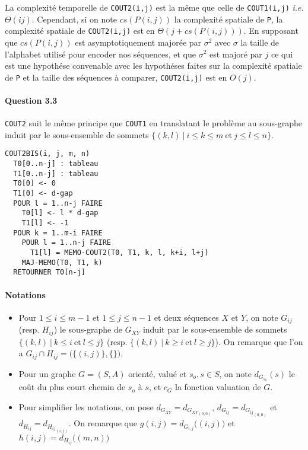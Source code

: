 La complexit\'e temporelle de \verb'COUT2(i,j)' est la m\^eme que
celle de \verb'COUT1(i,j)' \emph{i.e.} $\Theta(ij)$. Cependant, si on
note $cs(P(i,j))$ la complexit\'e spatiale de \verb'P', la
complexit\'e spatiale de \verb'COUT2(i,j)' est en
$\Theta(j+cs(P(i,j)))$. En supposant que $cs(P(i,j))$ est
asymptotiquement major\'ee par $\sigma^2$ avec $\sigma$ la taille de
l'alphabet utilis\'e pour encoder nos s\'equences, et que $\sigma^2$
est major\'e par $j$ ce qui est une hypoth\'ese convenable avec les
hypoth\'eses faites sur la complexit\'e spatiale de \verb'P' et la
taille des s\'equences \`a comparer, \verb'COUT2(i,j)' est en $O(j)$.

\paragraph{Question 3.3}
\verb'COUT2' suit le m\^eme principe que \verb'COUT1' en translatant
le probl\`eme au sous-graphe induit par le sous-ensemble de sommets
$\big\{(k,l)\ \big|\ i\leq k\leq m\ \text{et}\ j\leq l\leq n\big\}$.
\begin{verbatim}
COUT2BIS(i, j, m, n)
  T0[0..n-j] : tableau
  T1[0..n-j] : tableau
  T0[0] <- 0
  T1[0] <- d-gap
  POUR l = 1..n-j FAIRE
    T0[l] <- l * d-gap
    T1[l] <- -1
  POUR k = 1..m-i FAIRE
    POUR l = 1..n-j FAIRE
      T1[l] = MEMO-COUT2(T0, T1, k, l, k+i, l+j)
    MAJ-MEMO(T0, T1, k)
  RETOURNER T0[n-j]
\end{verbatim}
\paragraph{Notations}
\begin{itemize}
\item Pour $1\leq i\leq m-1$ et $1\leq j\leq n-1$ et deux s\'equences
  $X$ et $Y$, on note $G_{ij}$ (resp. $H_{ij}$) le sous-graphe de
  $G_{XY}$ induit par le sous-ensemble de sommets
  $\big\{(k,l)\ |\ k\leq i\ \text{et}\ l\leq j\big\}$
  (resp. $\big\{(k,l)\ |\ k\geq i\ \text{et}\ l\geq j\big\}$).
  On remarque que l'on a $G_{ij}\cap H_{ij}=\big(\{(i,j)\},\{\}\big)$.
\item Pour un graphe $G=(S,A)$ orient\'e, valu\'e et $s_o,s\in S$, on
  note $d_{G_{s_0}}(s)$ le co\^ut du plus court chemin de $s_o$ \`a
  $s$, et $c_G$ la fonction valuation de $G$.
\item Pour simplifier les notations, on pose
  $d_{G_{XY}}=d_{{G_{XY}}_{(0,0)}}$, $d_{G_{ij}}=d_{{G_{ij}}_{(0,0)}}$
  et $d_{H_{ij}}=d_{{H_{ij}}_{(i,j)}}$. On remarque que
  $g(i,j)=d_{G_{i,j}}\big((i,j)\big)$ et
  $h(i,j)=d_{H_{ij}}\big((m,n)\big)$
\end{itemize}

